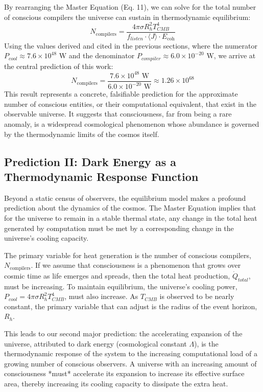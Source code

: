 \documentclass[11pt,a4paper]{article}
\theoremstyle{definition}
\theoremstyle{remark}
\begin{document}
By rearranging the Master Equation (Eq. 11), we can solve for the total number of conscious compilers the universe can sustain in thermodynamic equilibrium:
\begin{equation}
    N_{\text{compilers}} = \frac{4 \pi \sigma R_h^2 T_{CMB}^4}{f_{listen} \cdot \langle J \rangle \cdot E_{\text{coh}}}
\end{equation}
Using the values derived and cited in the previous sections, where the numerator \(P_{cool} \approx 7.6 \times 10^{48} \text{ W}\) and the denominator \(P_{compiler} \approx 6.0 \times 10^{-20} \text{ W}\), we arrive at the central prediction of this work:
\begin{equation}
    N_{\text{compilers}} = \frac{7.6 \times 10^{48} \text{ W}}{6.0 \times 10^{-20} \text{ W}} \approx 1.26 \times 10^{68}
\end{equation}
This result represents a concrete, falsifiable prediction for the approximate number of conscious entities, or their computational equivalent, that exist in the observable universe. It suggests that consciousness, far from being a rare anomaly, is a widespread cosmological phenomenon whose abundance is governed by the thermodynamic limits of the cosmos itself.

\subsection{Prediction II: Dark Energy as a Thermodynamic Response Function}

Beyond a static census of observers, the equilibrium model makes a profound prediction about the dynamics of the cosmos. The Master Equation implies that for the universe to remain in a stable thermal state, any change in the total heat generated by computation must be met by a corresponding change in the universe's cooling capacity.

The primary variable for heat generation is the number of conscious compilers, \(N_{\text{compilers}}\). If we assume that consciousness is a phenomenon that grows over cosmic time as life emerges and spreads, then the total heat production, \(\dot{Q}_{total}\), must be increasing. To maintain equilibrium, the universe's cooling power, \(P_{cool} = 4 \pi \sigma R_h^2 T_{CMB}^4\), must also increase. As \(T_{CMB}\) is observed to be nearly constant, the primary variable that can adjust is the radius of the event horizon, \(R_h\).

This leads to our second major prediction: the accelerating expansion of the universe, attributed to dark energy (cosmological constant \(\Lambda\)), is the thermodynamic response of the system to the increasing computational load of a growing number of conscious observers. A universe with an increasing amount of consciousness *must* accelerate its expansion to increase its effective surface area, thereby increasing its cooling capacity to dissipate the extra heat.
\end{document}
